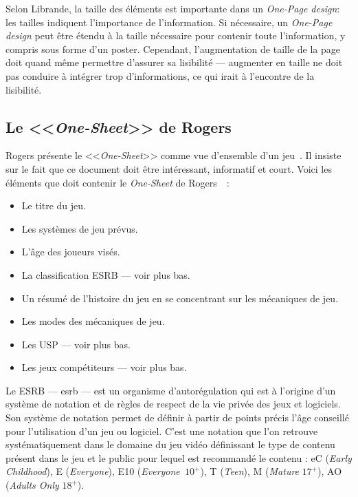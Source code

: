 Selon Librande, la taille des éléments est importante dans un \emph{One-Page design}: les tailles indiquent l'importance de l'information.
Si nécessaire, un \emph{One-Page design} peut être étendu à la taille nécessaire pour contenir toute l'information, y compris sous forme d'un poster.
Cependant, l'augmentation de taille de la page doit quand même permettre d'assurer sa lisibilité --- augmenter en taille ne doit pas conduire à intégrer trop d'informations, ce qui irait à l'encontre de la lisibilité.


\subsection{Le <<\emph{One-Sheet}>> de Rogers}



Rogers présente le <<\emph{One-Sheet}>> comme vue d'ensemble d'un jeu~\cite{LevelUpRogers2014}.
Il insiste sur le fait que ce document doit être intéressant, informatif et court.
Voici les éléments que doit contenir le \emph{One-Sheet} de Rogers~\cite{LevelUpRogers2014}~: 
\begin{itemize}
    \item Le titre du jeu.
    \item Les systèmes de jeu prévus.
    \item L'\^age des joueurs visés.
    \item La classification ESRB --- voir plus bas.
    \item Un résumé de l'histoire du jeu en se concentrant sur les mécaniques de jeu.
    \item Les modes des mécaniques de jeu.
    \item Les USP --- voir plus bas.
    \item Les jeux compétiteurs --- voir plus bas.
\end{itemize}


Le ESRB --- \gls{esrb} --- est un organisme d'autorégulation qui est à l'origine d'un système de notation et de règles de respect de la vie privée des jeux et logiciels.
Son système de notation permet de définir à partir de points précis l'âge conseillé pour l'utilisation d'un jeu ou logiciel.
C'est une notation que l'on retrouve systématiquement dans le domaine du jeu vidéo définissant le type de contenu présent dans le jeu et le public pour lequel est recommandé le contenu : eC (\emph{Early Childhood}), E (\emph{Everyone}), E10 (\emph{Everyone~$10^+$}), T (\emph{Teen}), M (\emph{Mature} $17^+$), AO (\emph{Adults Only} $18^+$).


